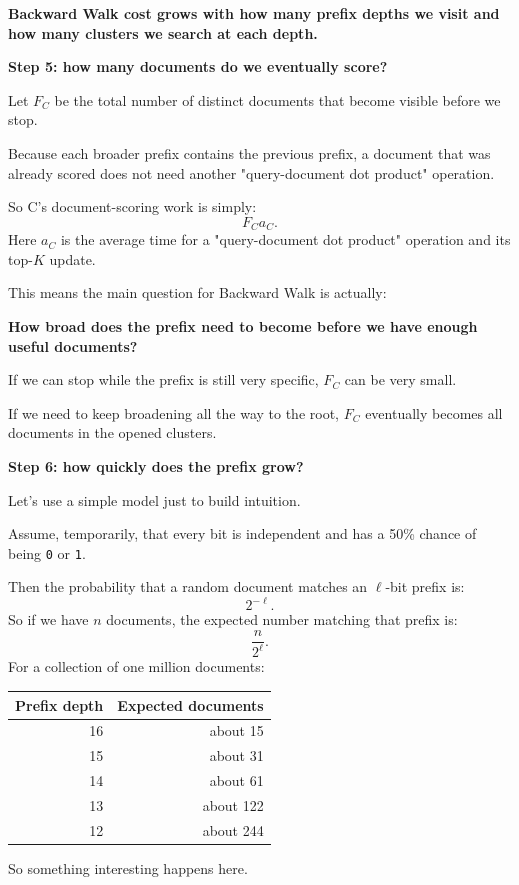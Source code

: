 
\textbf{Backward Walk cost grows with how many prefix depths we visit and how many clusters we search at each depth.}

\textbf{Step 5: how many documents do we eventually score?}\par
Let $F_C$ be the total number of distinct documents that become visible before we stop.

Because each broader prefix contains the previous prefix, a document that was already scored does not need another "query-document dot product" operation.

So C's document-scoring work is simply:
\[
F_Ca_C.
\]
Here $a_C$ is the average time for a "query-document dot product" operation and its top-$K$ update.

This means the main question for Backward Walk is actually:

\textbf{How broad does the prefix need to become before we have enough useful documents?}

If we can stop while the prefix is still very specific, $F_C$ can be very small.

If we need to keep broadening all the way to the root, $F_C$ eventually becomes all documents in the opened clusters.

\textbf{Step 6: how quickly does the prefix grow?}\par
Let's use a simple model just to build intuition.

Assume, temporarily, that every bit is independent and has a 50\% chance of being \texttt{0} or \texttt{1}.

Then the probability that a random document matches an $\ell$-bit prefix is:
\[
2^{-\ell}.
\]
So if we have $n$ documents, the expected number matching that prefix is:
\[
\frac{n}{2^\ell}.
\]
For a collection of one million documents:
\begin{center}
\begin{tabular}{@{}rr@{}}\toprule
Prefix depth & Expected documents\\\midrule
16 & about 15\\
15 & about 31\\
14 & about 61\\
13 & about 122\\
12 & about 244\\\bottomrule
\end{tabular}
\end{center}
So something interesting happens here.

